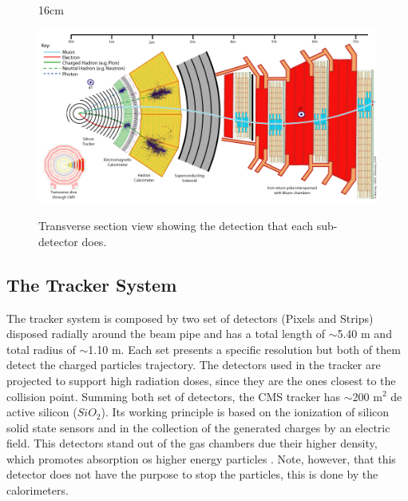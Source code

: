 \begin{figure}[htbp]{16cm}
	\caption{Transverse section view showing the detection that each sub-detector does.}
	\centering
	\includegraphics[scale=0.65,angle=90]{ChapterCMS/figs/cms_deteccao.png}
	\label{fig:cms_fig2}
\end{figure}

\subsection{The Tracker System}
The tracker system is composed by two set of detectors (Pixels and Strips) disposed radially around the beam pipe and has a total length of $\sim$5.40 m and total radius of $\sim$1.10 m. Each set presents a specific resolution but both of them detect the charged particles trajectory. The detectors used in the tracker are projected to support high radiation doses, since they are the ones closest to the collision point. Summing both set of detectors, the CMS tracker has $\sim$200 m$^{2}$ de active silicon ($SiO_{2}$). Its working principle is based on the ionization of silicon solid state sensors and in the collection of the generated charges by an electric field. This detectors stand out of the gas chambers due their higher density, which promotes absorption os higher energy particles \cite{bib:JINST-3-362-2008,bib:CMS-PTDR-2006,bib:grupen-2008}. Note, however, that this detector does not have the purpose to stop the particles, this is done by the calorimeters.

